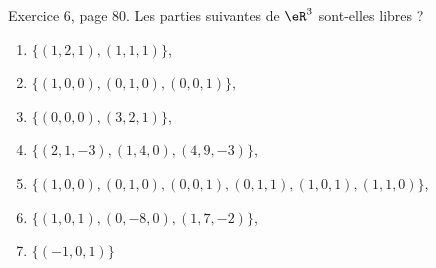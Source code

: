 \begin{exercice}\label{exoLineraire0016}

	Exercice 6, page 80. Les parties suivantes de $\eR^3$ sont-elles libres ?
	\begin{enumerate}

		\item
			$\{ (1,2,1), (1,1,1) \}$,
		\item
			$\{ (1,0,0),(0,1, 0),(0,0,1) \}$,
		\item
			$\{ (0,0,0),(3,2,1) \}$,
		\item
			$\{ (2,1,-3), (1,4,0), (4,9,-3) \}$,
		\item
			$\{ (1,0,0), (0,1,0),(0,0,1),(0,1,1),(1,0,1), (1,1,0) \}$,
		\item
			$\{ (1,0,1),(0,-8,0),(1,7,-2) \}$,
		\item
			$\{ (-1,0,1) \}$
	\end{enumerate}

\end{exercice}
